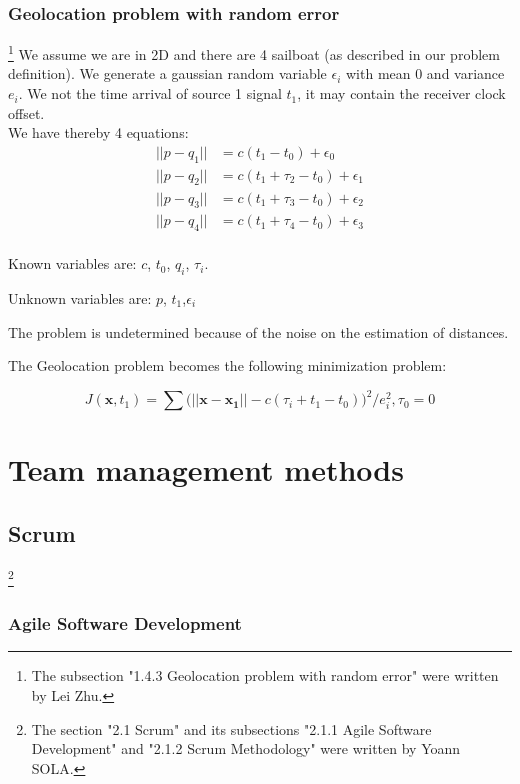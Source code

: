 \documentclass[a4paper]{report}
\begin{document}
\subsection{Geolocation problem with random error}
\footnote{The subsection "1.4.3 Geolocation problem with random error" were written by Lei Zhu.}
We assume we are in 2D and there are 4 sailboat (as described in our problem definition). We generate a gaussian random variable $\epsilon_i$ with mean  0 and variance $e_i$. We not the time arrival of source 1 signal $t_1$, it may contain the receiver clock offset.\\
We have thereby 4 equations: 
\begin{align}
||p - q_1|| &= c(t_1 - t_0) + \epsilon_0\nonumber \\
||p - q_2|| &= c(t_1 + \tau_2 - t_0) + \epsilon_1\\
||p - q_3|| &= c(t_1 + \tau_3 - t_0) + \epsilon_2\nonumber \\
||p - q_4|| &= c(t_1 + \tau_4 - t_0) + \epsilon_3\nonumber\\
\label{eq:distance_tdoa_ep}
\end{align}

Known variables are: $c$, $t_0$, $q_i$, $\tau_i$.

Unknown variables are: $p$, $t_1$,$\epsilon_i$

The problem is undetermined because of the noise on the estimation of distances.

The Geolocation problem becomes the following minimization problem:

\begin{equation}
J(\mathbf{x}, t_1) = \sum \Big ( ||\mathbf{x-x_1}|| - c(\tau_i+t_1-t_0) \Big )^2 / e_i^2 ,\tau_0=0
\end{equation}


\chapter{Team management methods}
\section{Scrum}

\footnote{The section "2.1 Scrum" and its subsections "2.1.1 Agile Software Development" and "2.1.2 Scrum Methodology" were written by Yoann SOLA.}

\subsection{Agile Software Development}
\end{document}
